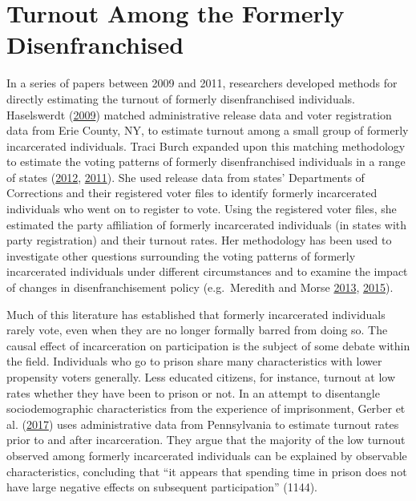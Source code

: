 \documentclass[
  12pt,
]{article}
\begin{document}
\hypertarget{turnout-among-the-formerly-disenfranchised}{%
\section*{Turnout Among the Formerly Disenfranchised}\label{turnout-among-the-formerly-disenfranchised}}

In a series of papers between 2009 and 2011, researchers developed methods for directly estimating the turnout of formerly disenfranchised individuals. Haselswerdt (\protect\hyperlink{ref-Haselswerdt2009}{2009}) matched administrative release data and voter registration data from Erie County, NY, to estimate turnout among a small group of formerly incarcerated individuals. Traci Burch expanded upon this matching methodology to estimate the voting patterns of formerly disenfranchised individuals in a range of states (\protect\hyperlink{ref-Burch2012}{2012}, \protect\hyperlink{ref-Burch2011}{2011}). She used release data from states' Departments of Corrections and their registered voter files to identify formerly incarcerated individuals who went on to register to vote. Using the registered voter files, she estimated the party affiliation of formerly incarcerated individuals (in states with party registration) and their turnout rates. Her methodology has been used to investigate other questions surrounding the voting patterns of formerly incarcerated individuals under different circumstances and to examine the impact of changes in disenfranchisement policy (e.g.~Meredith and Morse \protect\hyperlink{ref-Meredith2013}{2013}, \protect\hyperlink{ref-Meredith2015}{2015}).

Much of this literature has established that formerly incarcerated individuals rarely vote, even when they are no longer formally barred from doing so. The causal effect of incarceration on participation is the subject of some debate within the field. Individuals who go to prison share many characteristics with lower propensity voters generally. Less educated citizens, for instance, turnout at low rates whether they have been to prison or not. In an attempt to disentangle sociodemographic characteristics from the experience of imprisonment, Gerber et al. (\protect\hyperlink{ref-Gerber2017}{2017}) uses administrative data from Pennsylvania to estimate turnout rates prior to and after incarceration. They argue that the majority of the low turnout observed among formerly incarcerated individuals can be explained by observable characteristics, concluding that ``it appears that spending time in prison does not have large negative effects on subsequent participation'' (1144).
\end{document}

